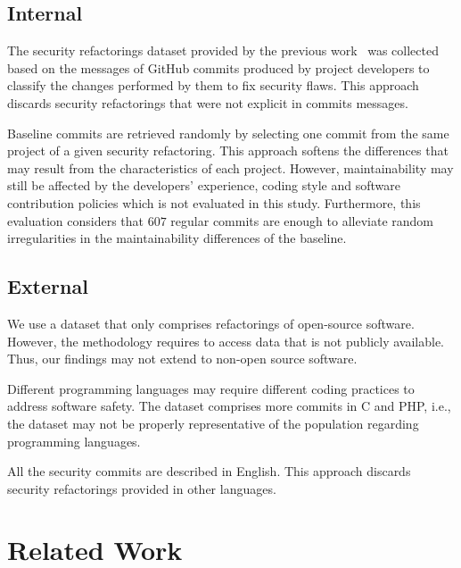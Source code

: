 \documentclass[10pt,conference]{IEEEtran}
\begin{document}
\subsection{Internal}

The security refactorings dataset provided by the previous
work~\cite{Reis:2017:IJSSE} was collected based on the messages of GitHub
commits produced by project developers to classify the changes performed by them
to fix security flaws. This approach discards security refactorings that were
not explicit in commits messages.

Baseline commits are retrieved randomly by selecting one commit from the same
project of a given security refactoring. This approach softens the differences
that may result from the characteristics of each project. However,
maintainability may still be affected by the developers' experience, coding
style and software contribution policies which is not evaluated in this study.
Furthermore, this evaluation considers that $607$ regular commits are enough to
alleviate random irregularities in the maintainability differences of the
baseline.

\subsection{External}

We use a dataset that only comprises refactorings of open-source software.
However, the methodology requires to access data that is not publicly available.
Thus, our findings may not extend to non-open source software.

Different programming languages may require different coding practices to
address software safety. The dataset comprises more commits in C and PHP, i.e.,
the dataset may not be properly representative of the population regarding
programming languages.

All the security commits are described in English. This approach discards
security refactorings provided in other languages.

\section{Related Work}\label{sec:rw}
\end{document}
